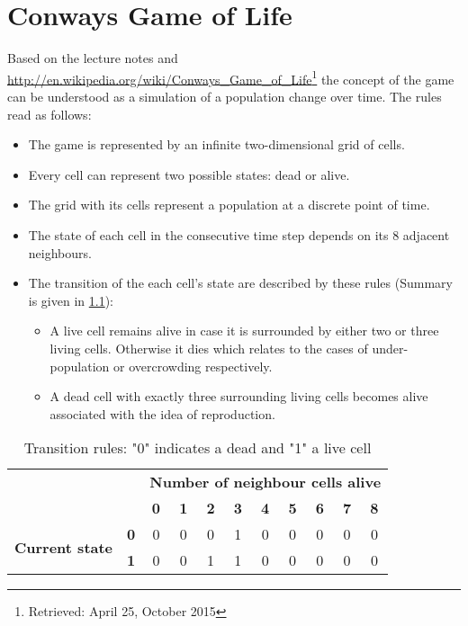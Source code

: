 \chapter{Conways Game of Life}

Based on the lecture notes and \url{http://en.wikipedia.org/wiki/Conways_Game_of_Life}\footnote{Retrieved: April 25, October 2015} the concept of the game can be understood as a simulation of a population change over time. The rules read as follows:
\begin{itemize}
	\item The game is represented by an infinite two-dimensional grid of cells.
	\item Every cell can represent two possible states: dead or alive.
	\item The grid with its cells represent a population at a discrete point of time.
	\item The state of each cell in the consecutive time step depends on its 8 adjacent neighbours.
	\item The transition of the each cell's state are described by these rules (Summary is given in \cref{table:rules}):
	\begin{itemize}
		\item A live cell remains alive in case it is surrounded by either two or three living cells. Otherwise it dies which relates to the cases of under-population or overcrowding respectively.
		\item A dead cell with exactly three surrounding living cells becomes alive associated with the idea of reproduction.
	\end{itemize}
\end{itemize}

\begin{table}[h]\centering
	\begin{tabular}{c c | c c c c c c c c c} \hline\hline
		& & \multicolumn{9}{c}{\bf Number of neighbour cells alive} \\
		& & \bf 0 & \bf 1 & \bf 2 & \bf 3 & \bf 4 & \bf 5 & \bf 6 & \bf 7 & \bf 8 \\ \hline
		\multirow{2}{*}{\bf Current state} & \bf 0 & 0 & 0 & 0 & 1 & 0 & 0 & 0 & 0 & 0 \\
		& \bf 1 & 0 & 0 & 1 & 1 & 0 & 0 & 0 & 0 & 0 \\
		\hline\hline
	\end{tabular}
	\caption[Transition rules]{Transition rules: "0" indicates a dead and "1" a live cell}
	\label{table:rules}
\end{table}


